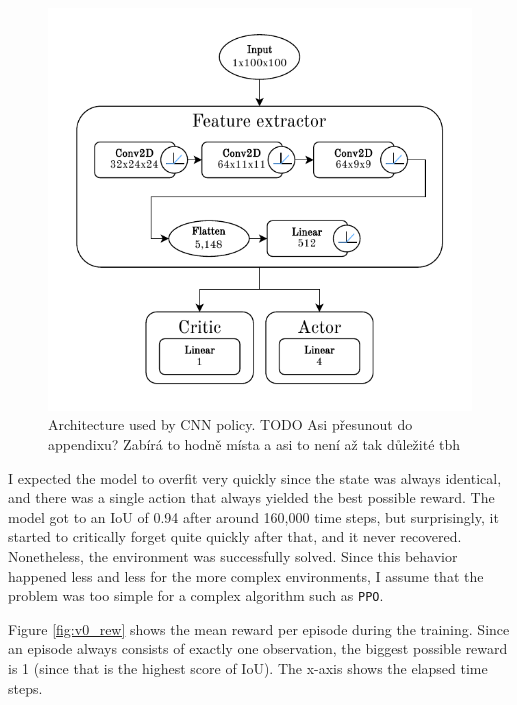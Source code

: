 \documentclass[
  digital,     %
  oneside,     %
  nosansbold,  %
  nocolorbold, %
  lof,         %
  lot,         %
]{fithesis4}
\begin{document}
\begin{figure}
    \includegraphics[width=1\linewidth]{diagrams/cnn_arch.pdf}
    \caption{Architecture used by CNN policy. TODO Asi přesunout do appendixu? Zabírá to hodně místa a asi to není až tak důležité tbh}
    \label{fig:cnn_policy}
\end{figure}

I expected the model to overfit very quickly since the state was always identical, and there was a single action that always yielded the best possible reward. The model got to an IoU of 0.94 after around 160,000 time steps, but surprisingly, it started to critically forget quite quickly after that, and it never recovered. Nonetheless, the environment was successfully solved. Since this behavior happened less and less for the more complex environments, I assume that the problem was too simple for a complex algorithm such as \texttt{PPO}.

Figure \ref{fig:v0_rew} shows the mean reward per episode during the training. Since an episode always consists of exactly one observation, the biggest possible reward is 1 (since that is the highest score of IoU). The x-axis shows the elapsed time steps.
\end{document}
